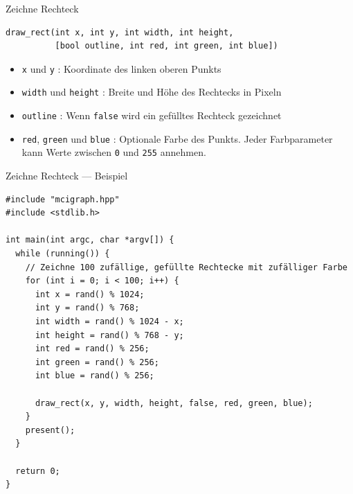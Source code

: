 \documentclass[presentation]{beamer}
\begin{document}
\begin{frame}[label={sec:orgbfd5a98},fragile]{Zeichne Rechteck}
 \begin{verbatim}
draw_rect(int x, int y, int width, int height,
          [bool outline, int red, int green, int blue])
\end{verbatim}
\begin{itemize}
\item {\color{solarizedYellow}\texttt{x} }und {\color{solarizedYellow}\texttt{y} }: Koordinate des linken oberen Punkts
\item {\color{solarizedYellow}\texttt{width} }und {\color{solarizedYellow}\texttt{height} }: Breite und Höhe des Rechtecks in Pixeln
\item {\color{solarizedYellow}\texttt{outline} }: Wenn {\color{solarizedYellow}\texttt{false} }wird ein gefülltes Rechteck gezeichnet
\item {\color{solarizedYellow}\texttt{red}}, {\color{solarizedYellow}\texttt{green} }und {\color{solarizedYellow}\texttt{blue} }: Optionale Farbe des Punkts. Jeder
Farbparameter kann Werte zwischen {\color{solarizedYellow}\texttt{0} }und {\color{solarizedYellow}\texttt{255} }annehmen.
\end{itemize}
\end{frame}
\begin{frame}[label={sec:orgc2e3f34},fragile]{Zeichne Rechteck --- Beispiel}
 \begin{verbatim}
#include "mcigraph.hpp"
#include <stdlib.h>

int main(int argc, char *argv[]) {
  while (running()) {
    // Zeichne 100 zufällige, gefüllte Rechtecke mit zufälliger Farbe
    for (int i = 0; i < 100; i++) {
      int x = rand() % 1024;
      int y = rand() % 768;
      int width = rand() % 1024 - x;
      int height = rand() % 768 - y;
      int red = rand() % 256;
      int green = rand() % 256;
      int blue = rand() % 256;

      draw_rect(x, y, width, height, false, red, green, blue);
    }
    present();
  }

  return 0;
}
\end{verbatim}
\end{frame}
\end{document}
